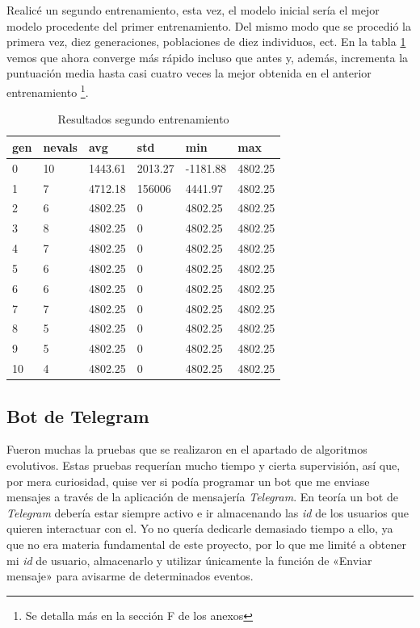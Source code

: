 Realicé un segundo entrenamiento, esta vez, el modelo inicial sería el mejor modelo procedente del primer entrenamiento. Del mismo modo que se procedió la primera vez, diez generaciones, poblaciones de diez individuos, ect. En la tabla \ref{result_segundo_entr} vemos que ahora converge más rápido incluso que antes y, además, incrementa la puntuación media hasta casi cuatro veces la mejor obtenida en el anterior entrenamiento \footnote{Se detalla más en la sección F de los anexos}.


\begin{table}[]
\centering
\begin{tabular}{|l|l|l|l|l|l|}
\hline
\rowcolor[HTML]{C0C0C0} 
gen & nevals & avg     & std     & min      & max     \\ \hline
0   & 10     & 1443.61 & 2013.27 & -1181.88 & 4802.25 \\ \hline
1   & 7      & 4712.18 & 156006  & 4441.97  & 4802.25 \\ \hline
2   & 6      & 4802.25 & 0       & 4802.25  & 4802.25 \\ \hline
3   & 8      & 4802.25 & 0       & 4802.25  & 4802.25 \\ \hline
4   & 7      & 4802.25 & 0       & 4802.25  & 4802.25 \\ \hline
5   & 6      & 4802.25 & 0       & 4802.25  & 4802.25 \\ \hline
6   & 6      & 4802.25 & 0       & 4802.25  & 4802.25 \\ \hline
7   & 7      & 4802.25 & 0       & 4802.25  & 4802.25 \\ \hline
8   & 5      & 4802.25 & 0       & 4802.25  & 4802.25 \\ \hline
9   & 5      & 4802.25 & 0       & 4802.25  & 4802.25 \\ \hline
10  & 4      & 4802.25 & 0       & 4802.25  & 4802.25 \\ \hline
\end{tabular}
\caption{Resultados segundo entrenamiento}
\label{result_segundo_entr}
\end{table}


\subsection{Bot de Telegram}
Fueron muchas la pruebas que se realizaron en el apartado de algoritmos evolutivos. Estas pruebas requerían mucho tiempo y cierta supervisión, así que, por mera curiosidad, quise ver si podía programar un bot que me enviase mensajes a través de la aplicación de mensajería \emph{Telegram}. 
En teoría un bot de \emph{Telegram} debería estar siempre activo e ir almacenando las \emph{id}  de los usuarios que quieren interactuar con el. Yo no quería dedicarle demasiado tiempo a ello, ya que no era materia fundamental de este proyecto, por lo que me limité a obtener mi \emph{id} de usuario, almacenarlo y utilizar únicamente la función de «Enviar mensaje» para avisarme de determinados eventos.


